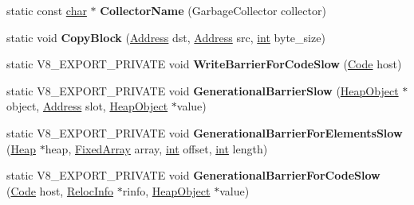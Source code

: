 \begin{DoxyCompactItemize}
static const \mbox{\hyperlink{classchar}{char}} $\ast$ {\bfseries Collector\+Name} (Garbage\+Collector collector)
\item 
\mbox{\label{classv8_1_1internal_1_1Heap_ac3641a0b7518d1536161ebcb69bc4be9}} 
static void {\bfseries Copy\+Block} (\mbox{\hyperlink{classuintptr__t}{Address}} dst, \mbox{\hyperlink{classuintptr__t}{Address}} src, \mbox{\hyperlink{classint}{int}} byte\+\_\+size)
\item 
\mbox{\label{classv8_1_1internal_1_1Heap_a4b0c9c8914c8dbde36bc9e2aea7b5881}} 
static V8\+\_\+\+E\+X\+P\+O\+R\+T\+\_\+\+P\+R\+I\+V\+A\+TE void {\bfseries Write\+Barrier\+For\+Code\+Slow} (\mbox{\hyperlink{classv8_1_1internal_1_1Code}{Code}} host)
\item 
\mbox{\label{classv8_1_1internal_1_1Heap_af4d29ade5cde9ef8e0dc997811a40afe}} 
static V8\+\_\+\+E\+X\+P\+O\+R\+T\+\_\+\+P\+R\+I\+V\+A\+TE void {\bfseries Generational\+Barrier\+Slow} (\mbox{\hyperlink{classv8_1_1internal_1_1HeapObject}{Heap\+Object}} $\ast$object, \mbox{\hyperlink{classuintptr__t}{Address}} slot, \mbox{\hyperlink{classv8_1_1internal_1_1HeapObject}{Heap\+Object}} $\ast$value)
\item 
\mbox{\label{classv8_1_1internal_1_1Heap_a30fbe457297ea6cf02e71d244ba6b20c}} 
static V8\+\_\+\+E\+X\+P\+O\+R\+T\+\_\+\+P\+R\+I\+V\+A\+TE void {\bfseries Generational\+Barrier\+For\+Elements\+Slow} (\mbox{\hyperlink{classv8_1_1internal_1_1Heap}{Heap}} $\ast$heap, \mbox{\hyperlink{classv8_1_1internal_1_1FixedArray}{Fixed\+Array}} array, \mbox{\hyperlink{classint}{int}} offset, \mbox{\hyperlink{classint}{int}} length)
\item 
\mbox{\label{classv8_1_1internal_1_1Heap_aa20a817cf5f16518a8aef5951a4cf808}} 
static V8\+\_\+\+E\+X\+P\+O\+R\+T\+\_\+\+P\+R\+I\+V\+A\+TE void {\bfseries Generational\+Barrier\+For\+Code\+Slow} (\mbox{\hyperlink{classv8_1_1internal_1_1Code}{Code}} host, \mbox{\hyperlink{classv8_1_1internal_1_1RelocInfo}{Reloc\+Info}} $\ast$rinfo, \mbox{\hyperlink{classv8_1_1internal_1_1HeapObject}{Heap\+Object}} $\ast$value)
\item 
\mbox{\label{classv8_1_1internal_1_1Heap_aeb41e26e0854c1ea09564738c7572fe6}} 

\end{DoxyCompactItemize}
